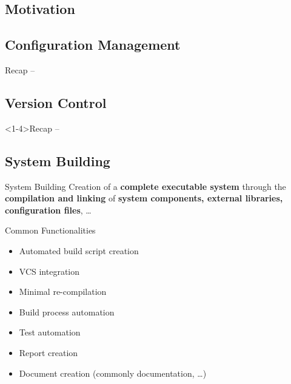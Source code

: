 
\subsection{Motivation}


\subsection{Configuration Management}
\begin{frame}{Recap -- \insertsubsection{} \mytitlesource{\sommerville}}
	\slideConfigManagement
\end{frame}

\subsection{Version Control}
\begin{frame}<1-4>{Recap -- \insertsubsection{}  \mytitlesource{\sommerville}}
	\slideVersionControl
\end{frame}

\subsection{System Building}
\begin{frame}{\insertsubsection{}  \mytitlesource{\sommerville}}
	\begin{fancycolumns}[animation=none]
		\begin{definition}{System Building}
			Creation of a \textbf{complete executable system} through the \textbf{compilation and linking} of \textbf{system components, external libraries, configuration files}, \dots
		\end{definition}\pause

		\begin{note}{Common Functionalities}
			\begin{itemize}
				\item Automated build script creation
				\item VCS integration
				\item Minimal re-compilation
				\item Build process automation
				\item Test automation
				\item Report creation
				\item Document creation (commonly documentation, \dots)
			\end{itemize}
		\end{note} \pause
		\nextcolumn
		\centering{}%
	\end{fancycolumns}
\end{frame}

